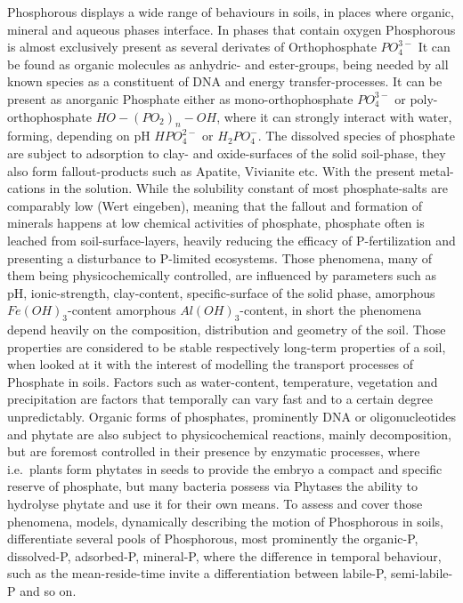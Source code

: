 \documentclass[
  letterpaper,
  DIV=11,
  numbers=noendperiod]{scrartcl}
\begin{document}
Phosphorous displays a wide range of behaviours in soils, in places
where organic, mineral and aqueous phases interface. In phases that
contain oxygen Phosphorous is almost exclusively present as several
derivates of Orthophosphate \(PO_4^{3-}\) It can be found as organic
molecules as anhydric- and ester-groups, being needed by all known
species as a constituent of DNA and energy transfer-processes. It can be
present as anorganic Phosphate either as mono-orthophosphate
\(PO_4^{3-}\) or poly-orthophosphate \(HO-(PO_2)_n-OH\), where it can
strongly interact with water, forming, depending on pH \(HPO_4^{2-}\) or
\(H_2PO_4^{-}\). The dissolved species of phosphate are subject to
adsorption to clay- and oxide-surfaces of the solid soil-phase, they
also form fallout-products such as Apatite, Vivianite etc. With the
present metal-cations in the solution. While the solubility constant of
most phosphate-salts are comparably low (Wert eingeben), meaning that
the fallout and formation of minerals happens at low chemical activities
of phosphate, phosphate often is leached from soil-surface-layers,
heavily reducing the efficacy of P-fertilization and presenting a
disturbance to P-limited ecosystems. Those phenomena, many of them being
physicochemically controlled, are influenced by parameters such as pH,
ionic-strength, clay-content, specific-surface of the solid phase,
amorphous \(Fe(OH)_3\)-content amorphous \(Al(OH)_3\)-content, in short
the phenomena depend heavily on the composition, distribution and
geometry of the soil. Those properties are considered to be stable
respectively long-term properties of a soil, when looked at it with the
interest of modelling the transport processes of Phosphate in soils.
Factors such as water-content, temperature, vegetation and precipitation
are factors that temporally can vary fast and to a certain degree
unpredictably. Organic forms of phosphates, prominently DNA or
oligonucleotides and phytate are also subject to physicochemical
reactions, mainly decomposition, but are foremost controlled in their
presence by enzymatic processes, where i.e.~plants form phytates in
seeds to provide the embryo a compact and specific reserve of phosphate,
but many bacteria possess via Phytases the ability to hydrolyse phytate
and use it for their own means. To assess and cover those phenomena,
models, dynamically describing the motion of Phosphorous in soils,
differentiate several pools of Phosphorous, most prominently the
organic-P, dissolved-P, adsorbed-P, mineral-P, where the difference in
temporal behaviour, such as the mean-reside-time invite a
differentiation between labile-P, semi-labile-P and so on.
\end{document}
